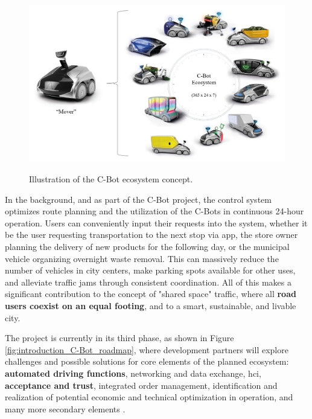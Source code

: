 \begin{figure}[htbp]
    \raggedright
        \caption{Illustration of the C-Bot ecosystem concept.}
        \includegraphics[width=1\textwidth]{resources/images/020-introduction/Introduction_context_C-Bot.png}
        \label{fig:introduction_C-Bot_ecosystem}
\end{figure} 

In the background, and as part of the C-Bot project, the control system optimizes route planning and the utilization of the C-Bots in continuous 24-hour operation. Users can conveniently input their requests into the system, whether it be the user requesting transportation to the next stop via app, the store owner planning the delivery of new products for the following day, or the municipal vehicle organizing overnight waste removal. This can massively reduce the number of vehicles in city centers, make parking spots available for other uses, and alleviate traffic jams through consistent coordination. All of this makes a significant contribution to the concept of "shared space" traffic, where all \textbf{road users coexist on an equal footing}, and to a smart, sustainable, and livable city.

The project is currently in its third phase, as shown in Figure \ref{fig:introduction_C-Bot_roadmap}, where development partners will explore challenges and possible solutions for core elements of the planned ecosystem: \textbf{automated driving functions}, networking and data exchange, \gls{hci}, \textbf{acceptance and trust}, integrated order management, identification and realization of potential economic and technical optimization in operation, and many more secondary elements \cite{EDAG2020}. 

